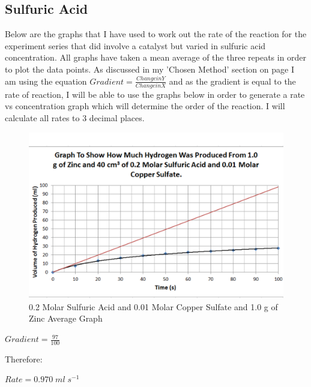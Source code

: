	\subsection{Sulfuric Acid}

Below are the graphs that I have used to work out the rate of the reaction for the experiment series that did involve a catalyst but varied in sulfuric acid concentration. All graphs have taken a mean average of the three repeats in order to plot the data points. As discussed in my 'Chosen Method' section on page \pageref{Chosen Method} I am using the equation $Gradient = \frac{Change in Y}{Change in X}$ and as the gradient is equal to the rate of reaction, I will be able to use the graphs below in order to generate a rate vs concentration graph which will determine the order of the reaction. I will calculate all rates to 3 decimal places.


\begin{figure}[H]
    \includegraphics[width=\textwidth]{./Analysis/Images/2Catalysed/02Molar.pdf}
    \caption{0.2 Molar Sulfuric Acid and 0.01 Molar Copper Sulfate and 1.0 g of Zinc Average Graph} \label{fig:02MolarSACSGradient}
\end{figure}

$Gradient = \frac{97}{100}$

Therefore:

$Rate = 0.970 \; ml \; s^{-1}$

